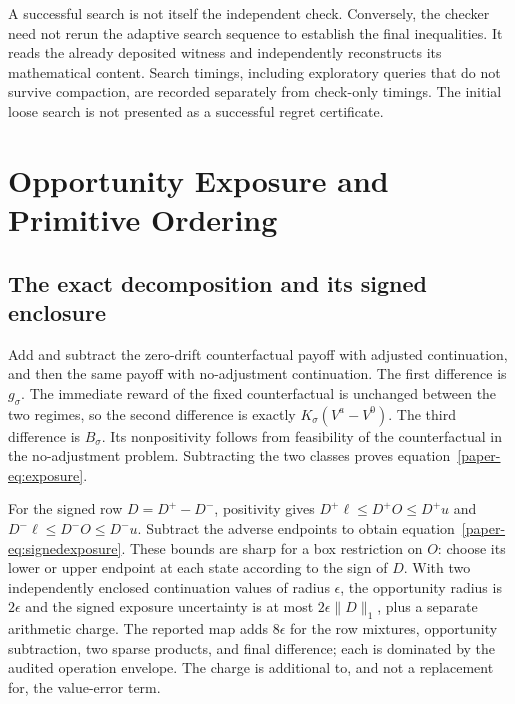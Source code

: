 A successful search is not itself the independent check. Conversely, the checker need not rerun the adaptive search sequence to establish the final inequalities. It reads the already deposited witness and independently reconstructs its mathematical content. Search timings, including exploratory queries that do not survive compaction, are recorded separately from check-only timings. The initial loose search is not presented as a successful regret certificate.



\section{Opportunity Exposure and Primitive Ordering}
\subsection{The exact decomposition and its signed enclosure}
Add and subtract the zero-drift counterfactual payoff with adjusted continuation, and then the same payoff with no-adjustment continuation. The first difference is $g_\sigma$. The immediate reward of the fixed counterfactual is unchanged between the two regimes, so the second difference is exactly $K_\sigma(V^a-V^0)$. The third difference is $B_\sigma$. Its nonpositivity follows from feasibility of the counterfactual in the no-adjustment problem. Subtracting the two classes proves equation~\eqref{paper-eq:exposure}.

For the signed row $D=D^+-D^-$, positivity gives $D^+\ell\leq D^+O\leq D^+u$ and $D^-\ell\leq D^-O\leq D^-u$. Subtract the adverse endpoints to obtain equation~\eqref{paper-eq:signedexposure}. These bounds are sharp for a box restriction on $O$: choose its lower or upper endpoint at each state according to the sign of $D$. With two independently enclosed continuation values of radius $\epsilon$, the opportunity radius is $2\epsilon$ and the signed exposure uncertainty is at most $2\epsilon\|D\|_1$, plus a separate arithmetic charge. The reported map adds $8\epsilon$ for the row mixtures, opportunity subtraction, two sparse products, and final difference; each is dominated by the audited operation envelope. The charge is additional to, and not a replacement for, the value-error term.

